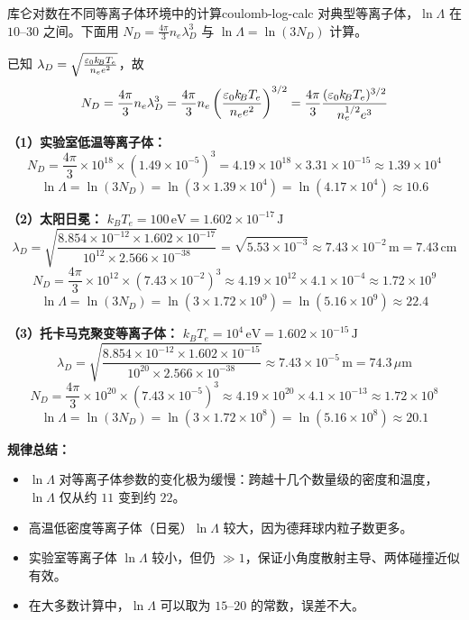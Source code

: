 \begin{example}{库仑对数在不同等离子体环境中的计算}{coulomb-log-calc}
对典型等离子体，$\ln\Lambda$ 在 $10$--$30$ 之间。下面用 $N_D = \frac{4\pi}{3} n_e \lambda_D^3$ 与 $\ln\Lambda=\ln(3N_D)$ 计算。

已知 $\lambda_D = \sqrt{\frac{\varepsilon_0 k_{\!B}T_e}{n_e e^2}}$，故
\[
N_D = \frac{4\pi}{3} n_e \lambda_D^3 = \frac{4\pi}{3} n_e \left(\frac{\varepsilon_0 k_{\!B}T_e}{n_e e^2}\right)^{3/2}
= \frac{4\pi}{3}\frac{(\varepsilon_0 k_{\!B}T_e)^{3/2}}{n_e^{1/2}e^3}
\]

\textbf{（1）实验室低温等离子体：}
\[
N_D = \frac{4\pi}{3}\times10^{18}\times (1.49\times 10^{-5})^3
= 4.19\times10^{18}\times 3.31\times 10^{-15}
\approx 1.39\times 10^4
\]
\[
\ln\Lambda = \ln(3N_D) = \ln(3\times 1.39\times 10^4) = \ln(4.17\times 10^4) \approx 10.6
\]

\textbf{（2）太阳日冕：}
$k_{\!B}T_e = 100\,\mathrm{eV} = 1.602\times 10^{-17}\,\mathrm{J}$
\[
\lambda_D = \sqrt{\frac{8.854\times 10^{-12}\times 1.602\times 10^{-17}}{10^{12}\times 2.566\times 10^{-38}}}
= \sqrt{5.53\times 10^{-3}} \approx 7.43\times 10^{-2}\,\mathrm{m} = 7.43\,\mathrm{cm}
\]
\[
N_D = \frac{4\pi}{3}\times10^{12}\times (7.43\times 10^{-2})^3 \approx 4.19\times10^{12}\times 4.1\times 10^{-4} \approx 1.72\times 10^9
\]
\[
\ln\Lambda = \ln(3N_D) = \ln(3\times 1.72\times 10^9) = \ln(5.16\times 10^9) \approx 22.4
\]

\textbf{（3）托卡马克聚变等离子体：}
$k_{\!B}T_e = 10^4\,\mathrm{eV} = 1.602\times 10^{-15}\,\mathrm{J}$
\[
\lambda_D = \sqrt{\frac{8.854\times 10^{-12}\times 1.602\times 10^{-15}}{10^{20}\times 2.566\times 10^{-38}}}
\approx 7.43\times 10^{-5}\,\mathrm{m} = 74.3\,\mu\mathrm{m}
\]
\[
N_D = \frac{4\pi}{3}\times10^{20}\times (7.43\times 10^{-5})^3 \approx 4.19\times10^{20}\times 4.1\times 10^{-13} \approx 1.72\times 10^8
\]
\[
\ln\Lambda = \ln(3N_D) = \ln(3\times 1.72\times 10^8) = \ln(5.16\times 10^8) \approx 20.1
\]

\textbf{规律总结：}
\begin{itemize}[leftmargin=*,itemsep=0pt]
\item $\ln\Lambda$ 对等离子体参数的变化极为缓慢：跨越十几个数量级的密度和温度，$\ln\Lambda$ 仅从约 $11$ 变到约 $22$。
\item 高温低密度等离子体（日冕）$\ln\Lambda$ 较大，因为德拜球内粒子数更多。
\item 实验室等离子体 $\ln\Lambda$ 较小，但仍 $\gg 1$，保证小角度散射主导、两体碰撞近似有效。
\item 在大多数计算中，$\ln\Lambda$ 可以取为 $15$--$20$ 的常数，误差不大。
\end{itemize}
\end{example}

